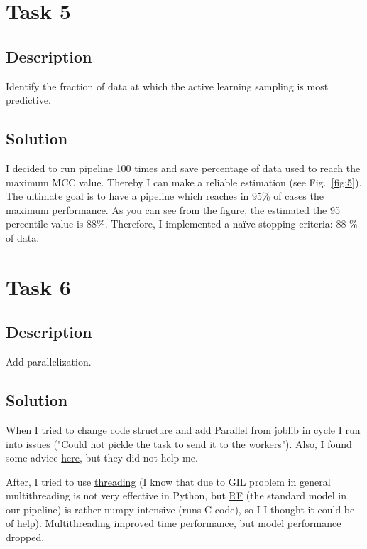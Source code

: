 \documentclass[a4paper,10pt]{article}
\begin{document}
\section{Task 5}


\subsection{Description}
Identify the fraction of data at which the active learning sampling is most predictive.
\subsection{Solution}
I decided to run pipeline 100 times and save percentage of data used to reach the maximum MCC value. Thereby I can make a reliable estimation (see Fig.~\ref{fig:5}). The ultimate goal is to have a pipeline which reaches in 95\% of cases the maximum performance. As you can see from the figure, the estimated the 95 percentile value is 88\%. Therefore, I implemented a naïve stopping criteria: 88 \% of data. 

\section{Task 6}

\subsection{Description}
Add parallelization.
\subsection{Solution}
When I tried to change code structure and add Parallel from joblib in cycle I run into issues (\href{https://github.com/joblib/joblib/issues/867}{"Could not pickle the task to send it to the workers"}). Also, I found some advice \href{https://stackoverflow.com/questions/56884020/spacy-with-joblib-library-generates-pickle-picklingerror-could-not-pickle-the}{here}, but they did not help me.

After, I tried to use \href{https://docs.python.org/3/library/threading.html}{threading} (I know that due to GIL problem in general multithreading is not very effective in Python, but \href{https://github.com/scikit-learn/scikit-learn/blob/42aff4e2e/sklearn/ensemble/_forest.py#L884}{RF} (the standard model in our pipeline) is rather numpy intensive (runs C code), so I I thought it could be of help). Multithreading improved time performance, but model performance dropped.
\end{document}
